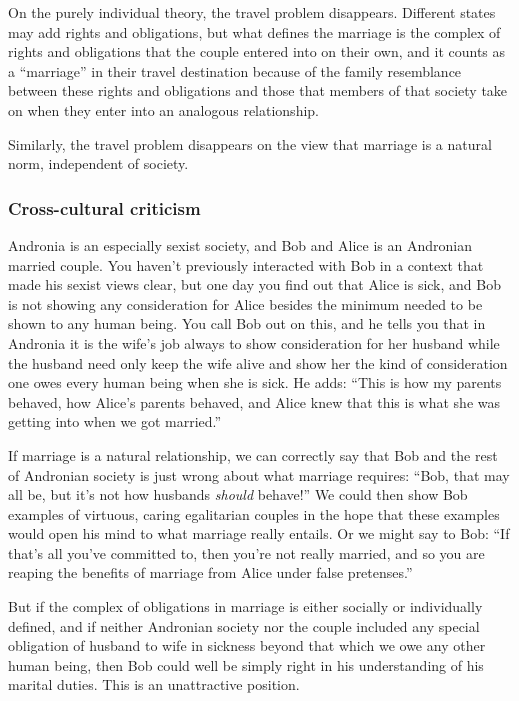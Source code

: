 On the purely individual theory, the travel problem disappears. Different states may add rights and obligations, but what defines the marriage is the
complex of rights and obligations that the couple entered into on their own, and it counts as a ``marriage'' in their travel destination because of the
family resemblance between these rights and obligations and those that members of that society take on when they enter into an analogous relationship. 

Similarly, the travel problem disappears on the view that marriage is a natural norm, independent of society.

\subsubsection{Cross-cultural criticism}
Andronia is an especially sexist society, and Bob and Alice is an Andronian married couple. You haven't previously interacted with Bob in a context that made his sexist
views clear, but one day you find out that Alice is sick, and Bob is not showing any consideration for Alice besides the minimum needed to be shown to any human being. You
call Bob out on this, and he tells you that in Andronia it is the wife's job always to show consideration for her husband while the husband need only keep the wife alive
and show her the kind of consideration one owes every human being when she is sick. He adds: ``This is how my parents behaved, how Alice's parents behaved, and Alice knew that this is what she was getting into when we got married.''

If marriage is a natural relationship, we can correctly say that Bob and the rest of Andronian society is just wrong about what marriage requires: ``Bob, that may all be, but it's not how husbands \textit{should} behave!'' We could then show Bob examples of virtuous, caring egalitarian couples
in the hope that these examples would open his mind to what marriage really entails. Or we might say to Bob: ``If that's all you've committed to, then
you're not really married, and so you are reaping the benefits of marriage from Alice under false pretenses.''

But if the complex of obligations in marriage is either socially or individually defined, and if neither Andronian society nor the couple included
any special obligation of husband to wife in sickness beyond that which we owe any other human being, then Bob could well be simply right in his understanding
of his marital duties. This is an unattractive position.

